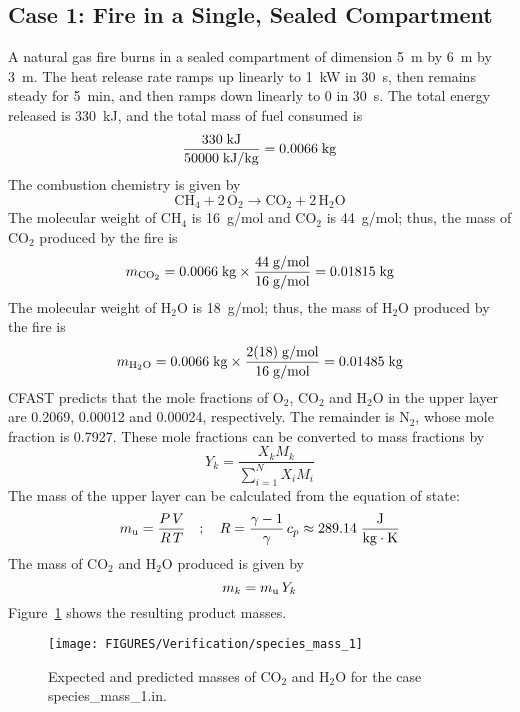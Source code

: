 \subsection{Case 1: Fire in a Single, Sealed Compartment}
\label{sec:spec1}
A natural gas fire burns in a sealed compartment of dimension 5~m by 6~m by 3~m. The heat release rate ramps up linearly to 1~kW in 30~s, then remains steady for 5~min, and then ramps down linearly to 0 in 30~s. The total energy released is 330~kJ, and the total mass of fuel consumed is
\begin{equation}
  \frac{ 330 \; {\rm kJ} }{ 50000 \; {\rm kJ/kg} } = 0.0066 \; {\rm kg}
\end{equation}
The combustion chemistry is given by
\begin{equation}
   \mathrm{CH_4 + 2 \, O_2 \to CO_2 + 2 \, H_2O}
\end{equation}
The molecular weight of CH$_4$ is 16~g/mol and CO$_2$ is 44~g/mol; thus, the mass of CO$_2$ produced by the fire is
\begin{equation}
   m_{\rm CO_2} = 0.0066 \; {\rm kg} \times  \frac{ 44 \; {\rm g/mol} }{ 16 \; {\rm g/mol} } = 0.01815 \; {\rm kg}
\end{equation}
The molecular weight of H$_2$O is 18~g/mol; thus, the mass of H$_2$O produced by the fire is
\begin{equation}
   m_{\rm H_2O} = 0.0066 \; {\rm kg} \times  \frac{ 2(18) \; {\rm g/mol} }{ 16 \; {\rm g/mol} } = 0.01485 \; {\rm kg}
\end{equation}
CFAST predicts that the mole fractions of O$_2$, CO$_2$ and H$_2$O in the upper layer are 0.2069, 0.00012 and 0.00024, respectively. The remainder is N$_2$, whose mole fraction is 0.7927. These mole fractions can be converted to mass fractions by
\begin{equation}
Y_k = \frac{X_{k} M_{k}}{\sum_{i=1}^N X_{i}M_{i}}
\end{equation}
The mass of the upper layer can be calculated from the equation of state:
\begin{equation}
m_{\rm u} = \frac{P \, V}{R \, T} \quad ; \quad R = \frac{\gamma-1}{\gamma} \, c_p \approx 289.14 \; {\rm  \frac{J}{kg \cdot K}}
\end{equation}
The mass of CO$_2$ and H$_2$O produced is given by
\begin{equation}
m_{k} = m_{\rm u} \, Y_{k}
\end{equation}
Figure~\ref{specmass1} shows the resulting product masses.

\begin{figure}[!ht]
\centering
\texttt{[image: FIGURES/Verification/species\_mass\_1]}
\caption[Results of the test case {\ct species\_mass\_1.in}]{Expected and predicted masses of CO$_2$ and H$_2$O for the case {\ct species\_mass\_1.in}.}
\label{specmass1}
\end{figure}


